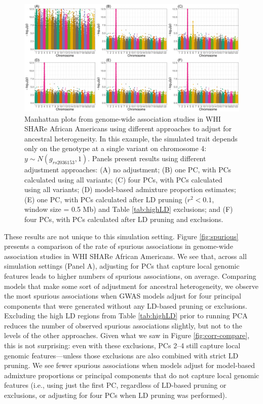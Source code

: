 \documentclass[12pt]{article}
\begin{document}
\begin{figure}[h]
\includegraphics[width=\textwidth]{figs/manhattan/WHI_manh_gwas_70}
\caption{Manhattan plots from genome-wide association studies in WHI SHARe African Americans using different approaches to adjust for ancestral heterogeneity. In this example, the simulated trait depends only on the genotype at a single variant on chromosome 4: $y \sim N(g_{rs2036153}, 1)$. Panels present results using different adjustment approaches: (A) no adjustment; (B) one PC, with PCs calculated using all variants; (C) four PCs, with PCs calculated using all variants; (D) model-based admixture proportion estimates; (E) one PC, with PCs calculated after LD pruning ($r^2 < 0.1$, window size = 0.5 Mb) and Table \ref{tab:highLD} exclusions; and (F) four PCs, with PCs calculated after LD pruning and exclusions.}
\label{fig:manh}
\end{figure}

These results are not unique to this simulation setting. 
Figure \ref{fig:spurious} presents a comparison of the rate of spurious associations in genome-wide association studies in WHI SHARe African Americans.
We see that, across all simulation settings (Panel A), adjusting for PCs that capture local genomic features leads to higher numbers of spurious associations, on average.
Comparing models that make some sort of adjustment for ancestral heterogeneity, we observe the most spurious associations when GWAS models adjust for four principal components that were generated without any LD-based pruning or exclusions.
Excluding the high LD regions from Table \ref{tab:highLD} prior to running PCA reduces the number of observed spurious associations slightly, but not to the levels of the other approaches.
Given what we saw in Figure \ref{fig:corr-compare}, this is not surprising: even with these exclusions, PCs 2--4 still capture local genomic features---unless those exclusions are also combined with strict LD pruning.
We see fewer spurious associations when models adjust for model-based admixture proportions or principal components that do not capture local genomic features (i.e., using just the first PC, regardless of LD-based pruning or exclusions, or adjusting for four PCs when LD pruning was performed).
\end{document}
